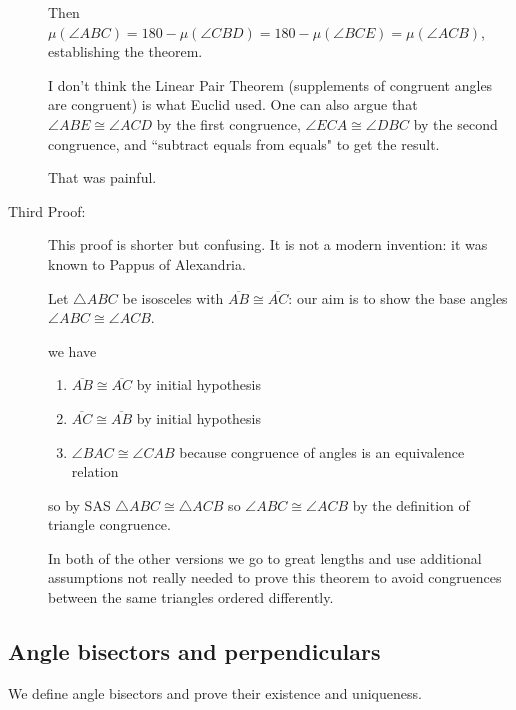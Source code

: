 \documentclass[12pt]{article}
\begin{document}
\begin{description}
Then $\mu(\angle ABC) = 180- \mu(\angle CBD)  = 180 - \mu(\angle BCE) = \mu(\angle ACB)$, establishing the theorem.

I don't think the Linear Pair Theorem (supplements of congruent angles are congruent) is what Euclid used.  One can also argue
that $\angle ABE \cong \angle ACD$ by the first congruence, $\angle ECA \cong \angle DBC$ by the second congruence, and ``subtract equals from
equals" to get the result.

That was painful.

\item[Third Proof:]  This proof is shorter but confusing.  It is not a modern invention:  it was known to Pappus of Alexandria.

Let $\triangle ABC$ be isosceles with $\overline{AB} \cong \overline{AC}$:  our aim is to show the base angles $\angle ABC \cong \angle ACB$.

we have

\begin{enumerate}

\item $\overline{AB} \cong \overline{AC}$ by initial hypothesis

\item  $\overline{AC} \cong \overline{AB}$ by initial hypothesis

\item  $\angle BAC \cong \angle CAB$   because congruence of angles is an equivalence relation

\end{enumerate}

so by SAS $\triangle ABC \cong \triangle ACB$ so $\angle ABC \cong \angle ACB$ by the definition of triangle congruence.

In both of the other versions we go to great lengths and use additional assumptions not really needed to prove this theorem to avoid congruences between the same triangles ordered differently.

\end{description}

\subsection{Angle bisectors and perpendiculars}

We define angle bisectors and prove their existence and uniqueness.
\end{document}
